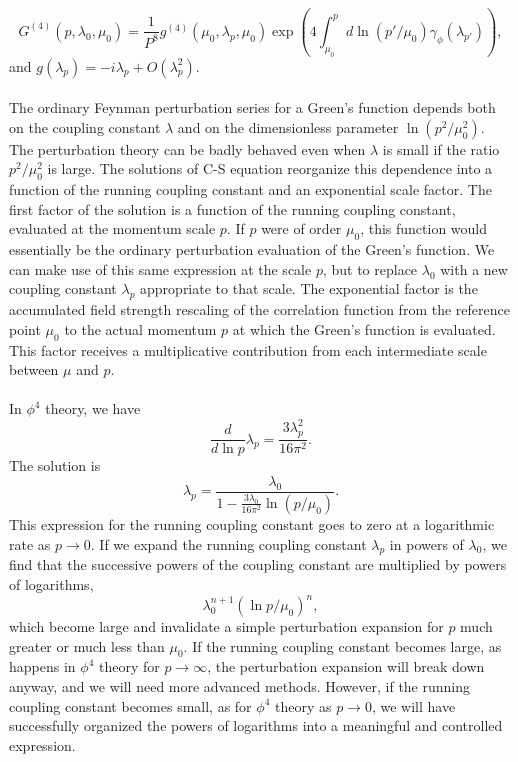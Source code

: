 \[G^{(4)}(p,\lambda_0,\mu_0) =  \frac{1}{P^8} g^{(4)}(\mu_0,\lambda_p,\mu_0)\exp \left (4\int_{\mu_0}^{p} d \ln(p'/\mu_0)  \gamma_{\phi}(\lambda_{p'}) \right ),\]
and $g(\lambda_p) = -i\lambda_p + O(\lambda_p^2)$.
\\ \\
The ordinary Feynman perturbation series for a Green's function depends both on the coupling constant $\lambda$ and on the dimensionless parameter $\ln(p^2/\mu_0^2)$. The perturbation theory can be badly behaved even when $\lambda$ is small if the ratio $p^2/\mu_0^2$ is large. The solutions of C-S equation reorganize this dependence into a function of the running coupling constant and an exponential scale factor. 
The first factor of the solution is a function of the running coupling constant, evaluated at the momentum scale $p$. If $p$ were of order $\mu_0$, this function would essentially be the ordinary perturbation evaluation of the Green's function. We can make use of this same expression at the scale $p$, but to replace $\lambda_0$ with a new coupling constant $\lambda_p$ appropriate to that scale.
The exponential factor is the accumulated field strength rescaling of the correlation function from the reference point $\mu_0$ to the actual momentum $p$ at which the Green's function is evaluated. This factor receives a multiplicative contribution from each intermediate scale between $\mu$ and $p$.
\\ \\
In $\phi^4$ theory, we have
\[\frac{d}{d\ln p} \lambda_p = \frac{3\lambda_p^2}{16\pi^2}.\]
The solution is
\[\lambda_p = \frac{\lambda_0}{1 - \frac{3\lambda_0}{16\pi^2} \ln (p/\mu_0)}.\]
This expression for the running coupling constant goes to zero at a logarithmic rate as $p \to 0$. If we expand the running coupling constant $\lambda_p$ in powers of $\lambda_0$, we find that the successive powers of the coupling constant are multiplied by powers of logarithms, 
\[\lambda_0^{n+1}(\ln p/\mu_0)^n,\]
which become large and invalidate a simple perturbation expansion for $p$ much greater or much less than $\mu_0$. If the running coupling constant becomes large, as happens in $\phi^4$ theory for $p \to \infty$, the perturbation expansion will break down anyway, and we will need more advanced methods. However, if the running coupling constant becomes small, as for $\phi^4$ theory as $p \to 0$, we will have successfully organized the powers of logarithms into a meaningful and controlled expression.

